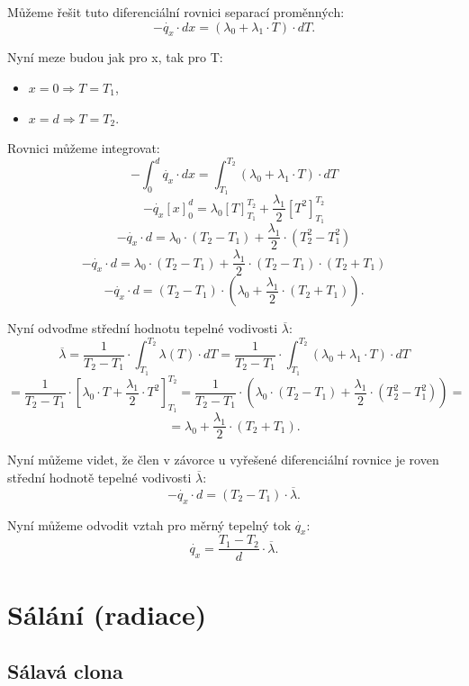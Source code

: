\documentclass{article}
\begin{document}
Můžeme řešit tuto diferenciální rovnici separací proměnných:
$$
    - \dot{q_x} \cdot dx = \left( \lambda_0 + \lambda_1 \cdot T \right) \cdot dT.
$$

Nyní meze budou jak pro x, tak pro T:
\begin{itemize}
    \item $x = 0 \Rightarrow T = T_1$,
    \item $x = d \Rightarrow T = T_2$.
\end{itemize}

Rovnici můžeme integrovat:
$$
    - \int_{0}^{d} \dot{q_x} \cdot dx = \int_{T_1}^{T_2} \left( \lambda_0 + \lambda_1 \cdot T \right) \cdot dT
$$
$$
    - \dot{q_x} \left[ x \right]_{0}^{d} = \lambda_0 \left[ T \right]_{T_1}^{T_2} + \frac{\lambda_1}{2} \left[ T^2 \right]_{T_1}^{T_2}
$$
$$
    - \dot{q_x} \cdot d = \lambda_0 \cdot (T_2 - T_1) + \frac{\lambda_1}{2} \cdot (T_2^2 - T_1^2)
$$
$$
    - \dot{q_x} \cdot d = \lambda_0 \cdot (T_2 - T_1) + \frac{\lambda_1}{2} \cdot (T_2 - T_1) \cdot (T_2 + T_1)
$$
$$
    - \dot{q_x} \cdot d = (T_2 - T_1) \cdot \left( \lambda_0 + \frac{\lambda_1}{2} \cdot (T_2 + T_1) \right).
$$

Nyní odvoďme střední hodnotu tepelné vodivosti $\overline{\lambda}$:
$$
    \overline{\lambda} = \frac{1}{T_2 - T_1} \cdot \int_{T_1}^{T_2} \lambda (T) \cdot dT = \frac{1}{T_2 - T_1} \cdot \int_{T_1}^{T_2} \left( \lambda_0 + \lambda_1 \cdot T \right) \cdot dT
$$
$$
    = \frac{1}{T_2 - T_1} \cdot \left[ \lambda_0 \cdot T + \frac{\lambda_1}{2} \cdot T^2 \right]_{T_1}^{T_2} = \frac{1}{T_2 - T_1} \cdot \left( \lambda_0 \cdot (T_2 - T_1) + \frac{\lambda_1}{2} \cdot (T_2^2 - T_1^2) \right) =
$$
$$
    = \lambda_0 + \frac{\lambda_1}{2} \cdot (T_2 + T_1).
$$

Nyní můžeme videt, že člen v závorce u vyřešené diferenciální rovnice je roven střední hodnotě tepelné vodivosti $\overline{\lambda}$:
$$
    - \dot{q_x} \cdot d = (T_2 - T_1) \cdot \overline{\lambda}.
$$

Nyní můžeme odvodit vztah pro měrný tepelný tok $\dot{q_x}$:
$$
    \dot{q_x} = \frac{T_1 - T_2}{d} \cdot \overline{\lambda}.
$$

\newpage



\section{ Sálání (radiace) \spicy \spicy}


\subsection{Sálavá clona}
\end{document}
